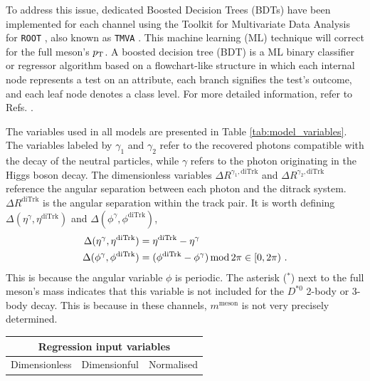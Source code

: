 \begin{myitemlist}
    To address this issue, dedicated Boosted Decision Trees (BDTs) have been implemented for each channel using the Toolkit for Multivariate Data Analysis for \verb+ROOT+ \cite{CERN:root}, also known as \verb+TMVA+ \cite{TMVA:2007ngy}. This machine learning (ML) technique will correct for the full meson's $p_\text{T}$. A boosted decision tree (BDT) is a ML binary classifier or regressor algorithm based on a flowchart-like structure in which each internal node represents a test on an attribute, each branch signifies the test's outcome, and each leaf node denotes a class level. For more detailed information, refer to Refs. \cite{TMVA:2007ngy, Coadou:2022nsh}.

    The variables used in all models are presented in Table \ref{tab:model_variables}. The variables labeled by $\gamma_1$ and $\gamma_2$ refer to the recovered photons compatible with the decay of the neutral particles, while $\gamma$ refers to the photon originating in the Higgs boson decay. The dimensionless variables $\Delta R^{\gamma_1, \text{diTrk}}$ and $\Delta R^{\gamma_2, \text{diTrk}}$ reference the angular separation between each photon and the ditrack system. $\Delta R^{\text{diTrk}}$ is the angular separation within the track pair. It is worth defining $\Delta(\eta^{\gamma}, \eta^{\text{diTrk}})$ and $\Delta(\phi^{\gamma}, \phi^{\text{diTrk}})$,
    \begin{equation*}
        \begin{aligned}
        \Delta(\eta^{\gamma}, \eta^{\text{diTrk}}) &= \eta^{\text{diTrk}} - \eta^{\gamma} \\
        \Delta(\phi^{\gamma}, \phi^{\text{diTrk}}) &= (\phi^{\text{diTrk}} - \phi^{\gamma}) \operatorname{mod} 2\pi \in[0, 2\pi)\ .
        \end{aligned}
    \end{equation*}
    This is because the angular variable $\phi$ is periodic. The asterisk ($^*$) next to the full meson's mass indicates that this variable is not included for the $D^{*0}$ 2-body or 3-body decay. This is because in these channels, $m^{\text{meson}}$ is not very precisely determined. 
    \begin{table}[!ht]
        \centering
        \begin{tabular}{|c|c|c|}
            \hline
            \multicolumn{3}{|c|}{\cellcolor{lightgray} Regression input variables} \\ \hline
            \cellcolor{lightgray}Dimensionless  &\cellcolor{lightgray}Dimensionful  &\cellcolor{lightgray}Normalised            \\\hline

\end{tabular}
\end{table}
\end{myitemlist}

